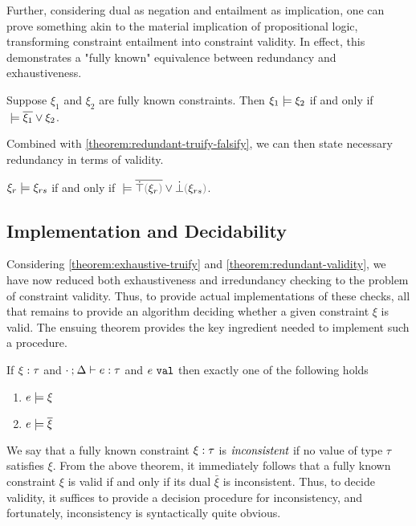 Further, considering dual as negation and entailment as implication, one can prove something akin to the material implication of propositional logic, transforming constraint entailment into constraint validity. In effect, this demonstrates a "fully known" equivalence between redundancy and exhaustiveness.

\begin{lemma}
	\label{lemma:material-entailment}
	Suppose $\xi_1$ and $\xi_2$ are fully known constraints. Then $\xi_1 \models \xi_2$ if and only if $\; \models \overline{\xi_1} \vee \xi_2$.
\end{lemma}

Combined with \autoref{theorem:redundant-truify-falsify}, we can then state necessary redundancy in terms of validity.

\begin{theorem}
	\label{theorem:redundant-validity}
	$\xi_r \models \xi_{rs}$ if and only if $\ccsatisfy{\;}{\cor{\cdual{\ctruify{\xi_r}}}{\cfalsify{\xi_{rs}}}}$.
\end{theorem}

\subsection{Implementation and Decidability}\label{sec:decidability}
Considering \autoref{theorem:exhaustive-truify} and \autoref{theorem:redundant-validity}, we have now reduced both exhaustiveness and irredundancy checking to the problem of constraint validity. Thus, to provide actual implementations of these checks, all that remains to provide an algorithm deciding whether a given constraint $\xi$ is valid. The ensuing theorem provides the key ingredient needed to implement such a procedure.

\begin{theorem}
	\label{theorem:exclusive-complete-constraint-satisfaction}
	If $\xi : \tau$ and $\cdot \mathbin{;} \Delta \vdash e : \tau$ and $e ~\mathtt{val}$ then exactly one of the following holds
	\begin{enumerate}
		\item $e \models \xi$
		\item $e \models \overline{\xi}$
	\end{enumerate}
\end{theorem}

We say that a fully known constraint $\xi : \tau$ is $\emph{inconsistent}$ if no value of type $\tau$ satisfies $\xi$. From the above theorem, it immediately follows that a fully known constraint $\xi$ is valid if and only if its dual $\bar{\xi}$ is inconsistent. Thus, to decide validity, it suffices to provide a decision procedure for inconsistency, and fortunately, inconsistency is syntactically quite obvious.

